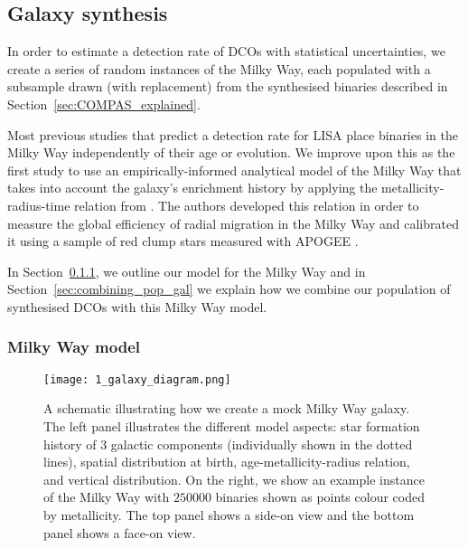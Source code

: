 \subsection{Galaxy synthesis}\label{sec:galaxy_synthesis}

In order to estimate a detection rate of DCOs with statistical uncertainties, we create a series of random instances of the Milky Way, each populated with a subsample drawn (with replacement) from the synthesised binaries described in Section~\ref{sec:COMPAS_explained}.

Most previous studies that predict a detection rate for LISA place binaries in the Milky Way independently of their age or evolution. We improve upon this as the first study to use an empirically-informed analytical model of the Milky Way that takes into account the galaxy's enrichment history by applying the metallicity-radius-time relation from \citet{Frankel+2018}. The authors developed this relation in order to measure the global efficiency of radial migration in the Milky Way and calibrated it using a sample of red clump stars measured with APOGEE \citep{Majewski+2017}.

In Section~\ref{sec:mw_model}, we outline our model for the Milky Way and in Section~\ref{sec:combining_pop_gal} we explain how we combine our population of synthesised DCOs with this Milky Way model.

\subsubsection{Milky Way model}\label{sec:mw_model}

\begin{figure*}[t]
    \centering
    \texttt{[image: 1\_galaxy\_diagram.png]}
    \caption{A schematic illustrating how we create a mock Milky Way galaxy. The left panel illustrates the different model aspects: star formation history of 3 galactic components (individually shown in the dotted lines), spatial distribution at birth, age-metallicity-radius relation, and vertical distribution.
    On the right, we show an example instance of the Milky Way with $250000$ binaries shown as points colour coded by metallicity. The top panel shows a side-on view and the bottom panel shows a face-on view.}
    \label{fig:galaxy_schematic}
\end{figure*}

